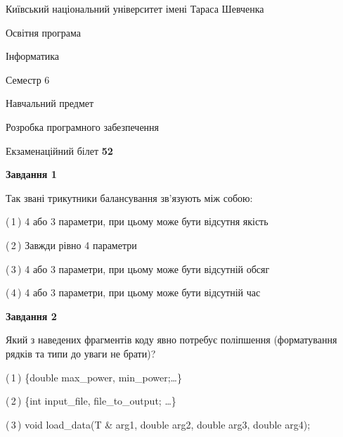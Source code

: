 \documentclass[10pt, ukrainian]{article}
\begin{document}
{{\begin {small}\par
{ \center  Київський національний університет імені Тараса Шевченка \par}
{\parbox {5 cm}{Освітня програма \hfill}{\parbox {7 cm}{Інформатика \hfill}}\parbox {6 cm}{\hfill Семестр 6}}\par
{\parbox {5 cm} {Навчальний предмет \hfill}\parbox {7 cm}{Розробка програмного забезпечення \hfill}\parbox {6cm}{\hfill}\par}\vspace{-7pt} \end{small}}{\center Екзаменаційний білет \No \textbf
{ 52 }\par}}
{
\begin {large}
{\begin {center}\textbf{Завдання 1}\end {center}}\par
Так звані трикутники балансування зв'язують між собою:\par
\vspace{2mm}



(\,1\,) 4 або 3 параметри, при цьому може бути відсутня якість%



(\,2\,) Завжди рівно 4 параметри%



(\,3\,) 4 або 3 параметри, при цьому може бути відсутній обсяг %



(\,4\,) 4 або 3 параметри, при цьому може бути відсутній час%


{\begin {center}\textbf{Завдання 2}\end {center}}\par
Який з наведених фрагментів коду явно потребує поліпшення (форматування рядків та типи до уваги не брати)?\par
\vspace{2mm}



(\,1\,) \{double max\_power, min\_power;…\} %



(\,2\,) \{int input\_file, file\_to\_output; …\}%



(\,3\,) void load\_data(T \& arg1, double arg2, double arg3, double arg4); %




\end{large}}
\end{document}
